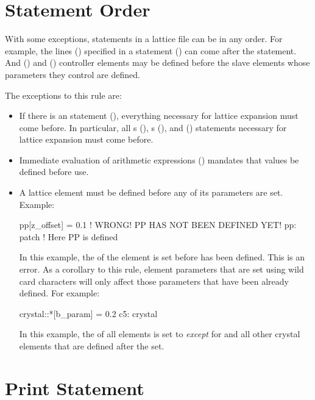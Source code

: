 {{{%
\section{Statement Order}
\label{s:state.order}

With some exceptions, statements in a lattice file can be in any order. For example, the lines
() specified in a  statement () can come after the 
statement. And  () and  () controller elements
may be defined before the slave elements whose parameters they control are defined.

The exceptions to this rule are:
\begin{itemize}
\item 
If there is an  statement (), everything necessary for
lattice expansion must come before. In particular, all s
(), s (), and  () statements
necessary for lattice expansion must come before.
\item
Immediate evaluation of arithmetic expressions () mandates that values be defined
before use.
\item
A lattice element must be defined before any of its parameters are set. Example:
\begin{example2}
  pp[z_offset] = 0.1    ! WRONG! PP HAS NOT BEEN DEFINED YET!
  pp: patch             ! Here PP is defined
\end{example2}
In this example, the  of the element  is set before  has been
defined. This is an error. As a corollary to this rule, element parameters that are set 
using wild card characters will only affect those parameters that have been already defined. For
example:
\begin{example2}
  crystal::*[b_param] = 0.2
  c5: crystal
\end{example2}
In this example, the  of all  elements is set to  {\em except} for
 and all other crystal elements that are defined after the set.
\end{itemize}

\section{Print Statement}
\label{s:print}

}}}
